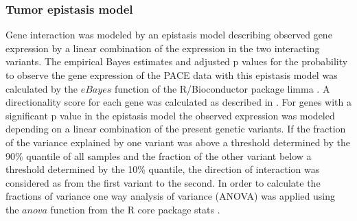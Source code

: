 \subsubsection{Tumor epistasis model}
Gene interaction was modeled by an epistasis model describing observed gene expression by a linear combination of the expression in the two interacting variants.
The empirical Bayes estimates and adjusted p values for the probability to observe the gene expression of the PACE data with this epistasis model was calculated by the $eBayes$ function of the R/Bioconductor package limma \citep{Ritchie2015}. A directionality score for each gene was calculated as described in \citet{Fischer2015}. For genes with a significant p value in the epistasis model the observed expression was modeled depending on a linear combination of the present genetic variants. If the fraction of the variance explained by one variant was above a threshold  determined by the 90\% quantile of all samples and the fraction of the other variant below a threshold determined by the 10\% quantile, the direction of interaction was considered as from the first variant to the second. In order to calculate the fractions of variance one way analysis of variance (ANOVA) was applied using the $anova$ function from the R core package stats \citep{RCoreTeam2017}.



